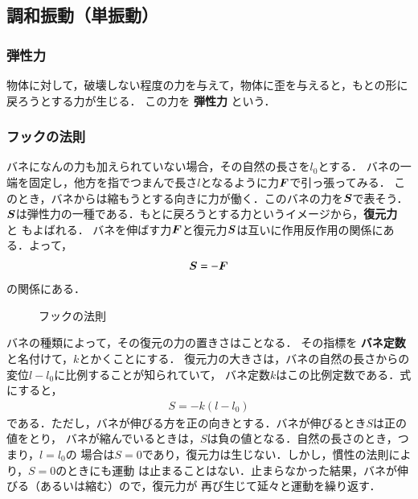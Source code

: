     \subsection{調和振動（単振動）}
    \subsubsection{弾性力}
        物体に対して，破壊しない程度の力を与えて，物体に歪を与えると，もとの形に戻ろうとする力が生じる．
        この力を \textbf{弾性力} という．

    \subsubsection{フックの法則}
        バネになんの力も加えられていない場合，その自然の長さを${l}_{0}$とする．
        バネの一端を固定し，他方を指でつまんで長さ$l$となるように力$\boldsymbol{F}$で引っ張ってみる．
        このとき，バネからは縮もうとする向きに力が働く．このバネの力を$\boldsymbol{S}$で表そう．
        $\boldsymbol{S}$は弾性力の一種である．もとに戻ろうとする力というイメージから，\textbf{復元力} と
        もよばれる．
        バネを伸ばす力$\boldsymbol{F}$と復元力$\boldsymbol{S}$は互いに作用反作用の関係にある．よって，
        \begin{align}
            \boldsymbol{S} = -\boldsymbol{F}
        \end{align}
        の関係にある．

        \begin{figure}[hbt]
            \begin{center}
                \caption{フックの法則}
                \label{fig:hookes_law}
            \end{center}
        \end{figure}
        バネの種類によって，その復元の力の置きさはことなる．
        その指標を \textbf{バネ定数} と名付けて，$k$とかくことにする．
        復元力の大きさは，バネの自然の長さからの変位$l-{l}_{0}$に比例することが知られていて，
        バネ定数$k$はこの比例定数である．式にすると，
        \begin{align}
            S = -k(l-{l}_{0})
        \end{align}
        である．ただし，バネが伸びる方を正の向きとする．バネが伸びるとき$S$は正の値をとり，
        バネが縮んでいるときは，$S$は負の値となる．自然の長さのとき，つまり，$l={l}_{0}$の
        場合は$S=0$であり，復元力は生じない．しかし，慣性の法則により，$S=0$のときにも運動
        は止まることはない．止まらなかった結果，バネが伸びる（あるいは縮む）ので，復元力が
        再び生じて延々と運動を繰り返す．

